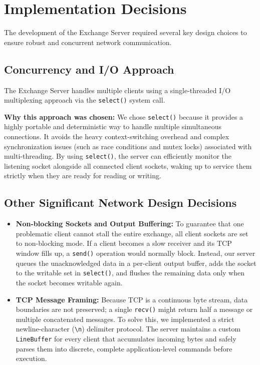 \documentclass[11pt,a4paper]{article}
\begin{document}
\section{Implementation Decisions}

The development of the Exchange Server required several key design choices to ensure robust and concurrent network communication.

\subsection{Concurrency and I/O Approach}
The Exchange Server handles multiple clients using a single-threaded I/O multiplexing approach via the \texttt{select()} system call. 

\textbf{Why this approach was chosen:} We chose \texttt{select()} because it provides a highly portable and deterministic way to handle multiple simultaneous connections. It avoids the heavy context-switching overhead and complex synchronization issues (such as race conditions and mutex locks) associated with multi-threading. By using \texttt{select()}, the server can efficiently monitor the listening socket alongside all connected client sockets, waking up to service them strictly when they are ready for reading or writing.

\subsection{Other Significant Network Design Decisions}
\begin{itemize}
    \item \textbf{Non-blocking Sockets and Output Buffering:} To guarantee that one problematic client cannot stall the entire exchange, all client sockets are set to non-blocking mode. If a client becomes a slow receiver and its TCP window fills up, a \texttt{send()} operation would normally block. Instead, our server queues the unacknowledged data in a per-client output buffer, adds the socket to the writable set in \texttt{select()}, and flushes the remaining data only when the socket becomes writable again.
    
    \item \textbf{TCP Message Framing:} Because TCP is a continuous byte stream, data boundaries are not preserved; a single \texttt{recv()} might return half a message or multiple concatenated messages. To solve this, we implemented a strict newline-character (\texttt{\textbackslash n}) delimiter protocol. The server maintains a custom \texttt{LineBuffer} for every client that accumulates incoming bytes and safely parses them into discrete, complete application-level commands before execution.
\end{itemize}
\end{document}
